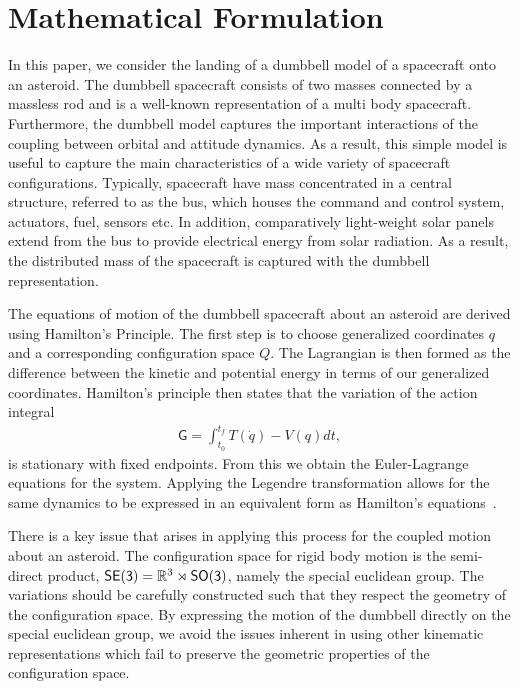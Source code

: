 \documentclass[letterpaper, paper,11pt]{AAS}		%
\begin{document}
\section{Mathematical Formulation}\label{se:mathematical_problem}
In this paper, we consider the landing of a dumbbell model of a spacecraft onto an asteroid.
The dumbbell spacecraft consists of two masses connected by a massless rod and is a well-known representation of a multi body spacecraft.
Furthermore, the dumbbell model captures the important interactions of the coupling between orbital and attitude dynamics. 
As a result, this simple model is useful to capture the main characteristics of a wide variety of spacecraft configurations.
Typically, spacecraft have mass concentrated in a central structure, referred to as the bus, which houses the command and control system, actuators, fuel, sensors etc. 
In addition, comparatively light-weight solar panels extend from the bus to provide electrical energy from solar radiation. 
As a result, the distributed mass of the spacecraft is captured with the dumbbell representation.


The equations of motion of the dumbbell spacecraft about an asteroid are derived using Hamilton's Principle. 
The first step is to choose generalized coordinates \( q \) and a corresponding configuration space \( Q \).
The Lagrangian is then formed as the difference between the kinetic and potential energy in terms of our generalized coordinates. 
Hamilton's principle then states that the variation of the action integral
\begin{align}
    \mathsf{G} = \int_{t_0}^{t_f} T(\dot{q}) - V(q) dt,
\end{align}
is stationary with fixed endpoints. 
From this we obtain the Euler-Lagrange equations for the system.
Applying the Legendre transformation allows for the same dynamics to be expressed in an equivalent form as Hamilton's equations~\cite{lanczos1970}.

There is a key issue that arises in applying this process for the coupled motion about an asteroid.
The configuration space for rigid body motion is the semi-direct product, \(\mathsf{SE(3)} = \mathbb{R}^3 \rtimes \mathsf{SO(3)} \), namely the special euclidean group.
The variations should be carefully constructed such that they respect the geometry of the configuration space.
By expressing the motion of the dumbbell directly on the special euclidean group, we avoid the issues inherent in using other kinematic representations which fail to preserve the geometric properties of the configuration space.
\end{document}
